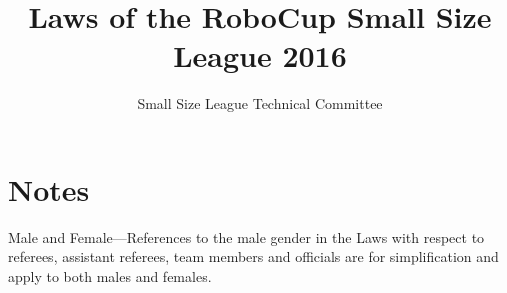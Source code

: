 \documentclass[12pt]{article}
\newif\ifdiff
\newcommand{\added}[1]{\textcolor{green}{#1}}
\newcommand{\removed}[1]{\textcolor{red}{#1}}
\newcommand{\added}[1]{#1}
\newcommand{\removed}[1]{}
\begin{document}
\setcounter{page}{1}

\title{Laws of the RoboCup Small Size League 2016}
\author{Small Size League Technical Committee}

\maketitle

\vfill

\tableofcontents

\section*{Notes}
Male and Female---References to the male gender in the Laws with respect to referees, assistant referees, team members and officials are for simplification and apply to both males and females.

\ifdiff
\added{Text added from the previous year is shown in green.}
\removed{Text removed from the previous year is shown in red.}
\fi

\thispagestyle{fancy}

\clearpage

\cfoot{\thepage}
\setcounter{page}{1}



















\appendix



\end{document}
